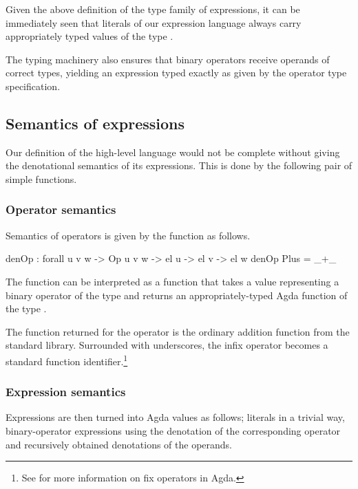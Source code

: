 Given the above definition of the type family of expressions, it can be immediately seen that
literals of our expression language always carry appropriately typed values of the
type .

The typing machinery also ensures that binary operators receive operands of correct
types, yielding an expression typed exactly as given by the operator type specification.

\subsection{Semantics of expressions}

Our definition of the high-level language would not be complete without giving
the denotational semantics of its expressions. This is done by the following
pair of simple functions.

\subsubsection{Operator semantics}

Semantics of operators is given by the function  as follows.

\begin{code}
  denOp : forall {u v w} -> Op u v w -> el u -> el v -> el w
  denOp Plus = _+\_
\end{code}

\noindent The function  can be interpreted as a function that takes a value
representing a binary operator of the type  and returns an appropriately-typed Agda
function of the type .

The function returned for the operator  is the ordinary addition function
from the standard library. Surrounded with underscores, the infix operator \ident{+} becomes
a standard function identifier.\footnote{See  for more information on
\textvisiblespace\hspace{0.8pt}fix operators in Agda.}

\subsubsection{Expression semantics}

Expressions are then turned into Agda values as follows; literals in a trivial
way, binary-operator expressions using the denotation of the corresponding
operator and recursively obtained denotations of the operands.

